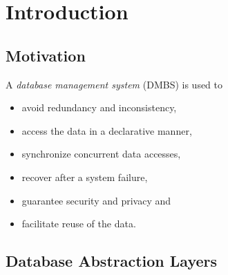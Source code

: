 

\section{Introduction}
\renewcommand{\leftmark}{\oldleftmark}




\subsection{Motivation}

A \emph{database management system} (DMBS) is used to
\begin{itemize}
\item avoid redundancy and inconsistency,
\item access the data in a declarative manner,
\item synchronize concurrent data accesses,
\item recover after a system failure,
\item guarantee security and privacy and
\item facilitate reuse of the data.
\end{itemize}




\subsection{Database Abstraction Layers}


